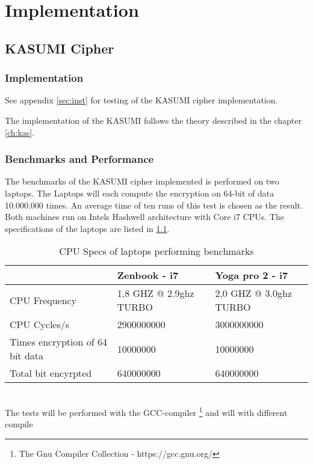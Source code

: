 \chapter{Implementation}
\label{ch:impl}
\section{KASUMI Cipher}
\subsection{Implementation}

See appendix \ref{sec:inst} for testing of the KASUMI cipher implementation.

The implementation of the KASUMI follows the theory described in the
chapter \ref{ch:kas}.

\subsection{Benchmarks and Performance}
\label{sec:benchkas}
The benchmarks of the KASUMI cipher implemented is performed on two
laptops. The Laptops will each compute the encryption on 64-bit of
data 10.000.000 times. An average time of ten runs of this test is
chosen as the result. Both machines run on Intels Hashwell
architecture with Core i7 CPUs. The specifications of the laptops are
listed in \ref{tab:specs}.
\begin{table}[h!]
    \begin{tabular}{l|l|l}
                                    & Zenbook - i7           & Yoga
                                                               pro 2 -
      i7\\ \hline
    CPU Frequency                   & 1,8 GHZ @ 2.9ghz TURBO & 2,0 GHZ @ 3.0ghz TURBO \\ \hline
    CPU Cycles/s                    & 2900000000             & 3000000000             \\ \hline
    Times encryption of 64 bit data & 10000000               & 10000000               \\ \hline
    Total bit encyrpted             & 640000000              & 640000000              \\
    \end{tabular}
    \caption{CPU Specs of laptops performing benchmarks}
    \label{tab:specs}
\end{table}\\
The tests will be performed with the
GCC-compiler \footnote{The Gnu Compiler Collection -
  https://gcc.gnu.org/} and will  with different compile
